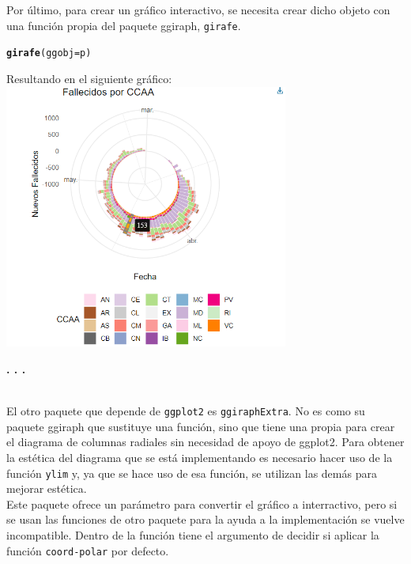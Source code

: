 \documentclass{article}\usepackage[]{graphicx}\usepackage[]{color}
\makeatletter
\newcommand{\hlstd}[1]{\textcolor[rgb]{0.345,0.345,0.345}{#1}}%
\newcommand{\hlkwc}[1]{\textcolor[rgb]{0.333,0.667,0.333}{#1}}%
\newcommand{\hlkwd}[1]{\textcolor[rgb]{0.737,0.353,0.396}{\textbf{#1}}}%
\newenvironment{kframe}{%
 \def\at@end@of@kframe{}%
 \ifinner\ifhmode%
  \def\at@end@of@kframe{\end{minipage}}%
  \begin{minipage}{\columnwidth}%
 \fi\fi%
 \def\FrameCommand##1{\hskip\@totalleftmargin \hskip-\fboxsep
 \colorbox{shadecolor}{##1}\hskip-\fboxsep
     \hskip-\linewidth \hskip-\@totalleftmargin \hskip\columnwidth}%
 \MakeFramed {\advance\hsize-\width
   \@totalleftmargin\z@ \linewidth\hsize
   \@setminipage}}%
 {\par\unskip\endMakeFramed%
 \at@end@of@kframe}
\newenvironment{knitrout}{}{} %
\makeatother
\begin{document}
Por \'ultimo, para crear un gr\'afico interactivo, se necesita crear dicho objeto con una funci\'on propia del paquete ggiraph, \texttt{girafe}.
\begin{knitrout}
\color{fgcolor}\begin{kframe}
\begin{alltt}
\hlkwd{girafe}\hlstd{(}\hlkwc{ggobj} \hlstd{= p)}
\end{alltt}
\end{kframe}
\end{knitrout}
\clearpage
Resultando en el siguiente gr\'afico:~\\
\vbox{
    \centering
    \includegraphics[width=0.7\textwidth]{imag/ggiraph_inte}
}
\begin{center}
\textbf{. . .}
\end{center}~\\
El otro paquete que depende de \texttt{ggplot2} es \texttt{ggiraphExtra}\cite{docu_ggiraphExtra}. No es como su paquete ggiraph que sustituye una funci\'on, sino que tiene una propia para crear el diagrama de columnas radiales sin necesidad de apoyo de ggplot2. Para obtener la est\'etica del diagrama que se est\'a implementando es necesario hacer uso de la funci\'on \texttt{ylim} y, ya que se hace uso de esa funci\'on, se utilizan las dem\'as para mejorar est\'etica.~\\
Este paquete ofrece un par\'ametro para convertir el gr\'afico a interractivo, pero si se usan las funciones de otro paquete para la ayuda a la implementaci\'on se vuelve incompatible.
Dentro de la funci\'on tiene el argumento de decidir si aplicar la funci\'on \texttt{coord-polar} por defecto.
\end{document}
